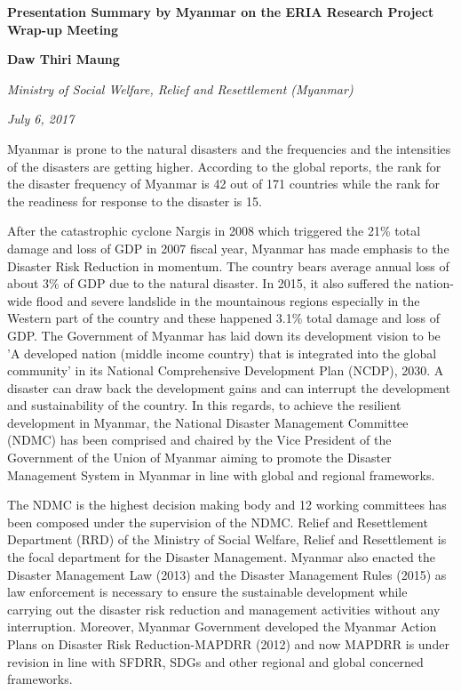 	\begin{center}
	{\large \bfseries Presentation Summary by Myanmar on the ERIA Research Project Wrap-up Meeting\par}
	\vspace{0.5 cm}
	{\bfseries Daw Thiri Maung\par}
	{\itshape Ministry of Social Welfare, Relief and Resettlement (Myanmar)\par}
	{\itshape July 6, 2017\par}
	\end{center}
	{\tab Myanmar is prone to the natural disasters and the frequencies and the intensities of the disasters are getting higher.  According to the global reports, the rank for the disaster frequency of Myanmar is 42 out of 171 countries while the rank for the readiness for response to the disaster is 15.
		
\vspace{0.4 cm}
  
After the catastrophic cyclone Nargis in 2008 which triggered the 21\% total damage and loss of GDP in 2007 fiscal year, Myanmar has made emphasis to the Disaster Risk Reduction in momentum. The country bears average annual loss of about 3\% of GDP due to the natural disaster. In 2015, it also suffered the nation-wide flood and severe landslide in the mountainous regions especially in the Western part of the country and these happened 3.1\% total damage and loss of GDP. The Government of Myanmar has laid down its development vision to be 'A developed nation (middle income country) that is integrated into the global community' in its National Comprehensive Development Plan (NCDP), 2030. A disaster can draw back the development gains and can interrupt the development and sustainability of the country. In this regards, to achieve the resilient development in Myanmar, the National Disaster Management Committee (NDMC) has been comprised and chaired by the Vice President of the Government of the Union of Myanmar aiming to promote the Disaster Management System in Myanmar in line with global and regional frameworks. 
		
\vspace{0.4 cm}
  
The NDMC is the highest decision making body and 12 working committees has been composed under the supervision of the NDMC. Relief and Resettlement Department (RRD) of the Ministry of Social Welfare, Relief and Resettlement is the focal department for the Disaster Management. Myanmar also enacted the Disaster Management Law (2013) and the Disaster Management Rules (2015) as law enforcement is necessary to ensure the sustainable development while carrying out the disaster risk reduction and management activities without any interruption. Moreover, Myanmar Government developed the Myanmar Action Plans on Disaster Risk Reduction-MAPDRR (2012) and now MAPDRR is under revision in line with SFDRR, SDGs and other regional and global concerned frameworks.
		
}

